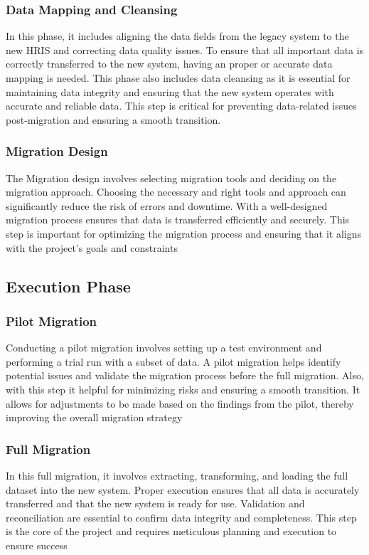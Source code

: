         \subsubsection{Data Mapping and Cleansing}
            In this phase, it includes aligning the data fields from the legacy system to the new HRIS and correcting data quality issues. To ensure that all important data is correctly transferred to the new system, having an proper or accurate data mapping is needed. This phase also includes data cleansing as it is essential for maintaining data integrity and ensuring that the new system operates with accurate and reliable data. This step is critical for preventing data-related issues post-migration and ensuring a smooth transition.

        \subsubsection{Migration Design}
            The Migration design involves selecting migration tools  and deciding on the migration approach. Choosing the necessary and right tools and approach can significantly reduce the risk of errors and downtime. With a well-designed migration process ensures that data is transferred efficiently and securely. This step is important for optimizing the migration process and ensuring that it aligns with the project's goals and constraints
        
    \subsection{Execution Phase}
        \subsubsection{Pilot Migration}
            Conducting a pilot migration involves setting up a test environment and performing a trial run with a subset of data. A pilot migration helps identify potential issues and validate the migration process before the full migration. Also, with this step it helpful for minimizing risks and ensuring a smooth transition. It allows for adjustments to be made based on the findings from the pilot, thereby improving the overall migration strategy

        \subsubsection{Full Migration}
            In this full migration, it involves extracting, transforming, and loading the full dataset into the new system. Proper execution ensures that all data is accurately transferred and that the new system is ready for use. Validation and reconciliation are essential to confirm data integrity and completeness. This step is the core of the project and requires meticulous planning and execution to ensure success

